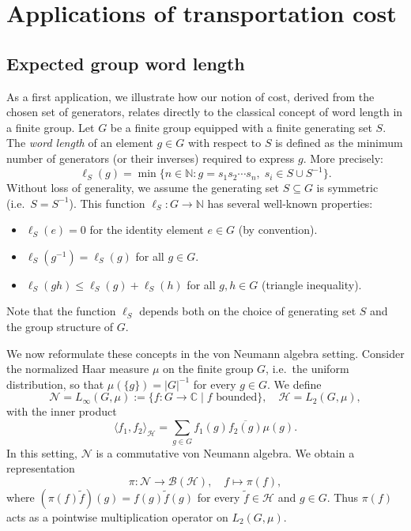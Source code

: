 \documentclass[11pt,reqno]{amsart}
\numberwithin{equation}{section}
\begin{document}
\section{Applications of transportation cost} \label{sec:application cost}
\subsection{Expected group word length}\label{sec:finite group}
As a first application, we illustrate how our notion of cost, derived from the chosen set of generators, relates directly to the classical concept of word length in a finite group. Let $G$ be a finite group equipped with a finite generating set $S$. The \emph{word length} of an element $g \in G$ with respect to $S$ is defined as the minimum number of generators (or their inverses) required to express $g$. More precisely:
\[
    \ell_{S}(g) = \min \{ n \in \mathbb{N} : g = s_1 s_2 \cdots s_n, \; s_i \in S \cup S^{-1} \}.
\]
Without loss of generality, we assume the generating set $S \subseteq G$ is symmetric (i.e.\ $S=S^{-1}$). This function $\ell_S: G \to \mathbb{N}$ has several well-known properties:
\begin{itemize}
    \item $\ell_{S}(e) = 0$ for the identity element $e \in G$ (by convention).
    \item $\ell_{S}(g^{-1}) = \ell_{S}(g)$ for all $g \in G$.
    \item $\ell_{S}(gh) \leq \ell_{S}(g) + \ell_{S}(h)$ for all $g,h \in G$ (triangle inequality).
\end{itemize}
Note that the function $\ell_{S}$ depends both on the choice of generating set $S$ and the group structure of $G$.

We now reformulate these concepts in the von Neumann algebra setting. Consider the normalized Haar measure $\mu$ on the finite group $G$, i.e.\ the uniform distribution, so that $\mu(\{g\}) = |G|^{-1}$ for every $g \in G$. We define
\begin{equation}\label{def:von Neumann algebra finite group}
    \mathcal{N} = L_{\infty}(G,\mu) := \{ f : G \to \mathbb{C} \mid f \text{ bounded} \}, \quad \mathcal{H} = L_2(G,\mu),
\end{equation}
with the inner product 
\[
    \langle f_1, f_2\rangle_{\mathcal{H}} = \sum_{g \in G} f_1(g) \overline{f_2(g)} \mu(g).
\]
In this setting, $\mathcal{N}$ is a commutative von Neumann algebra. We obtain a representation 
\[
    \pi: \mathcal{N} \to \mathcal{B}(\mathcal{H}), \quad f \mapsto \pi(f),
\]
where $(\pi(f)\widetilde{f})(g) = f(g)\widetilde{f}(g)$ for every $\widetilde{f} \in \mathcal{H}$ and $g \in G$. Thus $\pi(f)$ acts as a pointwise multiplication operator on $L_2(G,\mu)$.
\end{document}

